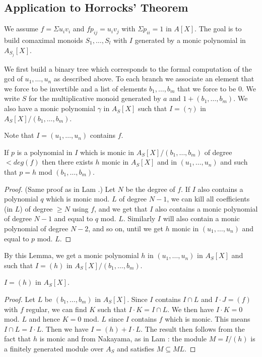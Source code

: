 \subsection{Application to Horrocks' Theorem}

We assume $f = \Sigma u_iv_i$ and $fp_{ij} = u_iv_j$ with $\Sigma p_{ii} = 1$
in $A[X]$. The goal is to build comaximal monoids $S_1,\dots,S_l$ with $I$ generated by
a monic polynomial in $A_{S_j}[X]$.

We first build a binary tree which corresponds to the formal computation of the gcd of
$u_1,\dots,u_n$ as described above. To each branch we associate an element that
we force to be invertible and a list of elements $b_1,\dots,b_m$ that we force to be $0$.
We write $S$ for the multiplicative monoid generated by $a$ and $1 + (b_1,\dots,b_m)$.
We also have a monic polynomial $\gamma$ in $A_S[X]$ 
such that $I = (\gamma)$ in $A_S[X]/(b_1,\dots,b_m)$.

 Note that $I = (u_1,\dots,u_n)$ contains $f$.

\begin{lemma}
  If $p$ is a polynomial in $I$ which is monic in $A_S[X]/(b_1,\dots,b_m)$ of degree $<deg(f)$
  then there exists $h$ monic in
  $A_S[X]$ and in $(u_1,\dots,u_n)$ and such that $p=h$ mod $(b_1,\dots,b_m)$.
\end{lemma}

\begin{proof}
  (Same proof as in Lam \cite{Lam}.) Let $N$ be the degree of $f$.
  If $I$ also contains a polynomial $q$ which is monic
  mod. $L$ of degree $N-1$, we can kill all coefficients (in $L$) of degree $\geqslant N$
  using $f$, and we get that $I$ also contains a monic polynomial of degree $N-1$
  and equal to $q$ mod. $L$.
  Similarly $I$ will also contain a monic polynomial of degree $N-2$, and so on, until
  we get $h$ monic in $(u_1,\dots,u_n)$ and equal to $p$ mod. $L$.
\end{proof}

By this Lemma, we get a monic polynomial $h$ in $(u_1,\dots,u_n)$ in $A_S[X]$
and such that $I=(h)$ in $A_S[X]/(b_1,\dots,b_m)$.

\begin{lemma}
 $I = (h)$ in $A_{S}[X]$.
\end{lemma}

\begin{proof}
  Let $L$ be $(b_1,\dots,b_m)$ in $A_S[X]$.
  Since $I$ contains $I\cap L$ and $I\cdot J = (f)$ with $f$ regular, we can find $K$
  such that $I\cdot K = I\cap L$.
  We then have $I\cdot K = 0$ mod. $L$ and hence $K = 0$ mod. $L$ since $I$ contains $f$
  which is monic.
  This means $I\cap L = I\cdot L$. Then we have $I = (h) + I\cdot L$.
  The result then follows from the fact that $h$ is monic and from Nakayama, as in Lam \cite{Lam}:
  the module $M = I/(h)$ is a finitely generated module over $A_S$ and satisfies
  $M\subseteq ML$.
\end{proof}

